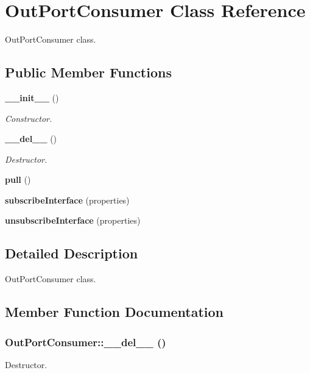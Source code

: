 \section{Out\-Port\-Consumer Class Reference}
\label{classOutPortConsumer}
Out\-Port\-Consumer class.  


\subsection*{Public Member Functions}
\begin{CompactItemize}
\item 
{\bf \_\-\_\-init\_\-\_\-} ()
\begin{CompactList}\small\item\em Constructor. \item\end{CompactList}\item 
{\bf \_\-\_\-del\_\-\_\-} ()
\begin{CompactList}\small\item\em Destructor. \item\end{CompactList}\item 
{\bf pull} ()
\item 
{\bf subscribe\-Interface} (properties)
\item 
{\bf unsubscribe\-Interface} (properties)
\end{CompactItemize}


\subsection{Detailed Description}
Out\-Port\-Consumer class. 



\subsection{Member Function Documentation}
\subsubsection{\setlength{\rightskip}{0pt plus 5cm}Out\-Port\-Consumer::\_\-\_\-del\_\-\_\- ()}\label{classOutPortConsumer_OutPortConsumera1}


Destructor. 

